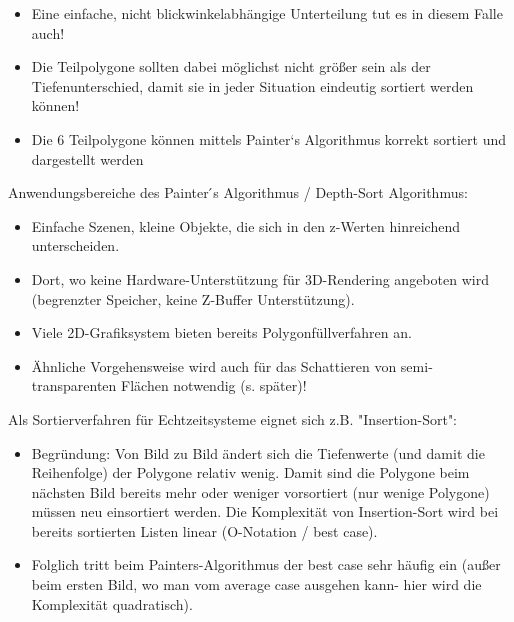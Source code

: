 \documentclass[10pt,landscape]{article}
\begin{document}
\begin{multicols}{3}
{  %
  
  \begin{itemize}
    \item Eine einfache, nicht blickwinkelabhängige Unterteilung tut es in diesem Falle auch!
    \item Die Teilpolygone sollten dabei möglichst nicht größer sein als der Tiefenunterschied, damit sie in jeder Situation eindeutig sortiert werden können!
    \item Die 6 Teilpolygone können mittels Painter‘s Algorithmus korrekt sortiert und dargestellt werden
  \end{itemize}
  
  Anwendungsbereiche des Painter ́s Algorithmus / Depth-Sort Algorithmus:
  \begin{itemize}
    \item Einfache Szenen, kleine Objekte, die sich in den z-Werten hinreichend unterscheiden.
    \item Dort, wo keine Hardware-Unterstützung für 3D-Rendering angeboten wird (begrenzter Speicher, keine Z-Buffer Unterstützung).
    \item Viele 2D-Grafiksystem bieten bereits Polygonfüllverfahren an.
    \item Ähnliche Vorgehensweise wird auch für das Schattieren von semi-transparenten Flächen notwendig (s. später)!
  \end{itemize}
  
  Als Sortierverfahren für Echtzeitsysteme eignet sich z.B. "Insertion-Sort":
  \begin{itemize}
    \item Begründung: Von Bild zu Bild ändert sich die Tiefenwerte (und damit die Reihenfolge) der Polygone relativ wenig. Damit sind die Polygone beim nächsten Bild bereits mehr oder weniger vorsortiert (nur wenige Polygone) müssen neu einsortiert werden. Die Komplexität von Insertion-Sort wird bei bereits sortierten Listen linear (O-Notation / best case).
    \item Folglich tritt beim Painters-Algorithmus der best case sehr häufig ein (außer beim ersten Bild, wo man vom average case ausgehen kann- hier wird die Komplexität quadratisch).
  \end{itemize}
  
}
\end{multicols}
\end{document}
